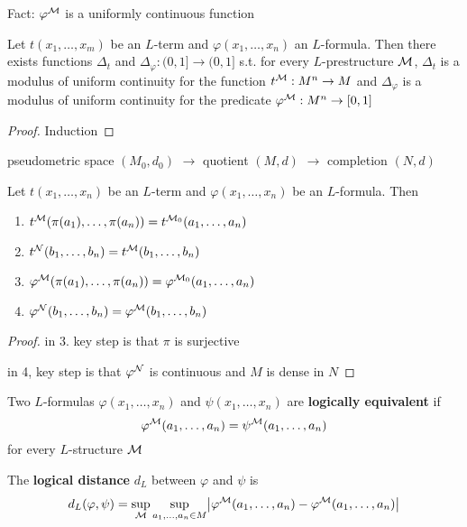 \documentclass[11pt]{article}
\begin{document}
Fact: \(\varphi^{\mathcal{M}}\) is a uniformly continuous function

\begin{theorem}[]
\label{thmA.1}
Let \(t(x_1,\dots,x_m)\) be an \(L\)-term and \(\varphi(x_1,\dots,x_n)\) an \(L\)-formula. Then there
exists functions \(\Delta_t\) and \(\Delta_{\varphi} :(0,1]\to(0,1]\) s.t.
for every \(L\)-prestructure \(\mathcal{M}\), \(\Delta_t\) is a modulus of uniform continuity for the
function \(t^{\mathcal{M}}:M^n\to M\) and \(\Delta_\varphi\) is a modulus of uniform continuity for the
predicate \(\varphi^{\mathcal{M}}:M^n\to[0,1]\)
\end{theorem}

\begin{proof}
Induction
\end{proof}

\begin{theorem}[]
\label{thmA.2}
pseudometric space \((M_0,d_0)\) \(\to\) quotient \((M,d)\) \(\to\) completion \((N,d)\)

Let \(t(x_1,\dots,x_n)\) be an \(L\)-term and \(\varphi(x_1,\dots,x_n)\) be an \(L\)-formula. Then
\begin{enumerate}
\item \(t^{\mathcal{M}}(\pi(a_1),\dots,\pi(a_n))=t^{\mathcal{M}_0}(a_1,\dots,a_n)\)
\item \(t^{\mathcal{N}}(b_1,\dots,b_n)=t^{\mathcal{M}}(b_1,\dots,b_n)\)
\item \(\varphi^{\mathcal{M}}(\pi(a_1),\dots,\pi(a_n))=\varphi^{\mathcal{M}_0}(a_1,\dots,a_n)\)
\item \(\varphi^{\mathcal{N}}(b_1,\dots,b_n)=\varphi^{\mathcal{M}}(b_1,\dots,b_n)\)
\end{enumerate}
\end{theorem}

\begin{proof}
in 3. key step is that \(\pi\) is surjective

in 4, key step is that \(\varphi^{\mathcal{N}}\) is continuous and \(M\) is dense in \(N\)
\end{proof}


Two \(L\)-formulas \(\varphi(x_1,\dots,x_n)\) and \(\psi(x_1,\dots,x_n)\) are \textbf{logically equivalent} if
\begin{equation*}
 \varphi^{\mathcal{M}}(a_1,\dots,a_n)=\psi^{\mathcal{M}}(a_1,\dots,a_n)
\end{equation*}
for every \(L\)-structure \(\mathcal{M}\)

The \textbf{logical distance} \(d_L\) between \(\varphi\) and \(\psi\) is
\begin{equation*}
 d_L(\varphi,\psi)=\sup_{\calm}\sup_{a_1,\dots,a_n\in M}\abs{\varphi^{\calm}(a_1,\dots,a_n)-\varphi^{\calm}(a_1,\dots,a_n)}
\end{equation*}
\end{document}
